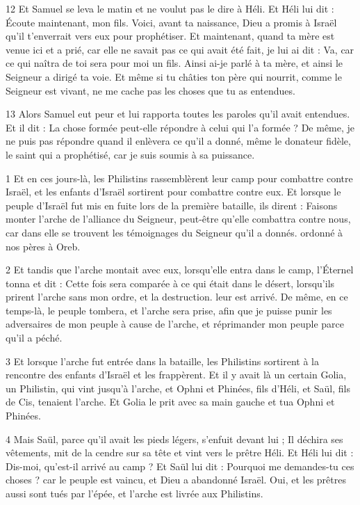 \par 12 Et Samuel se leva le matin et ne voulut pas le dire à Héli. Et Héli lui dit : Écoute maintenant, mon fils. Voici, avant ta naissance, Dieu a promis à Israël qu'il t'enverrait vers eux pour prophétiser. Et maintenant, quand ta mère est venue ici et a prié, car elle ne savait pas ce qui avait été fait, je lui ai dit : Va, car ce qui naîtra de toi sera pour moi un fils. Ainsi ai-je parlé à ta mère, et ainsi le Seigneur a dirigé ta voie. Et même si tu châties ton père qui nourrit, comme le Seigneur est vivant, ne me cache pas les choses que tu as entendues.

\par 13 Alors Samuel eut peur et lui rapporta toutes les paroles qu'il avait entendues. Et il dit : La chose formée peut-elle répondre à celui qui l'a formée ? De même, je ne puis pas répondre quand il enlèvera ce qu'il a donné, même le donateur fidèle, le saint qui a prophétisé, car je suis soumis à sa puissance.




\par 1 Et en ces jours-là, les Philistins rassemblèrent leur camp pour combattre contre Israël, et les enfants d'Israël sortirent pour combattre contre eux. Et lorsque le peuple d'Israël fut mis en fuite lors de la première bataille, ils dirent : Faisons monter l'arche de l'alliance du Seigneur, peut-être qu'elle combattra contre nous, car dans elle se trouvent les témoignages du Seigneur qu'il a donnés. ordonné à nos pères à Oreb.

\par 2 Et tandis que l'arche montait avec eux, lorsqu'elle entra dans le camp, l'Éternel tonna et dit : Cette fois sera comparée à ce qui était dans le désert, lorsqu'ils prirent l'arche sans mon ordre, et la destruction. leur est arrivé. De même, en ce temps-là, le peuple tombera, et l'arche sera prise, afin que je puisse punir les adversaires de mon peuple à cause de l'arche, et réprimander mon peuple parce qu'il a péché.

\par 3 Et lorsque l'arche fut entrée dans la bataille, les Philistins sortirent à la rencontre des enfants d'Israël et les frappèrent. Et il y avait là un certain Golia, un Philistin, qui vint jusqu'à l'arche, et Ophni et Phinées, fils d'Héli, et Saül, fils de Cis, tenaient l'arche. Et Golia le prit avec sa main gauche et tua Ophni et Phinées.

\par 4 Mais Saül, parce qu'il avait les pieds légers, s'enfuit devant lui ; Il déchira ses vêtements, mit de la cendre sur sa tête et vint vers le prêtre Héli. Et Héli lui dit : Dis-moi, qu'est-il arrivé au camp ? Et Saül lui dit : Pourquoi me demandes-tu ces choses ? car le peuple est vaincu, et Dieu a abandonné Israël. Oui, et les prêtres aussi sont tués par l'épée, et l'arche est livrée aux Philistins.

